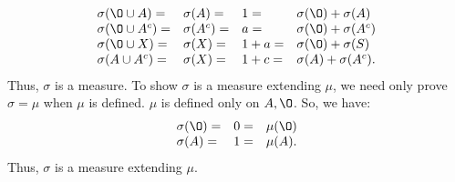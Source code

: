 \begin{enumerate}
\begin{pf}
\[
\begin{array}{llll}
\sigma(\O \cup A)= & \sigma(A)= & 1 = & \sigma(\O) + \sigma(A) \\
\sigma(\O \cup A^c)= & \sigma(A^c)= & a = & \sigma(\O) + \sigma(A^c) \\
\sigma(\O \cup X)= & \sigma(X)= & 1 + a = & \sigma(\O) + \sigma(S) \\
\sigma(A \cup A^c)= & \sigma(X)= & 1+c = & \sigma(A) + \sigma(A^c) .
\end{array}
\]
Thus, $\sigma$ is a measure. To show $\sigma$ is a measure extending $\mu$, we need only prove $\sigma=\mu$ when $\mu$ is defined. $\mu$ is defined only on $A, \O$. So, we have:
 \[
\begin{array}{lll}
\sigma(\O)= & 0 = & \mu(\O) \\
\sigma(A)= & 1 = & \mu(A) .
\end{array}
\]
Thus, $\sigma$ is a measure extending $\mu$. 
\end{pf}


\end{enumerate}